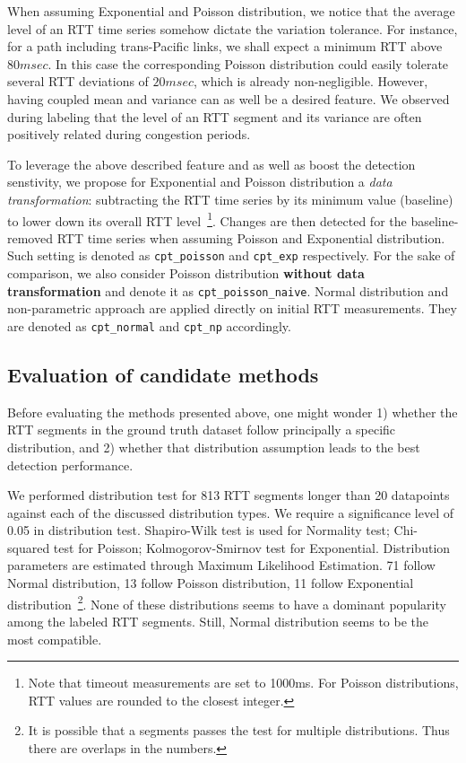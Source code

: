 When assuming Exponential and Poisson distribution, we notice that the average level of an RTT time series somehow dictate the variation tolerance.
For instance, for a path including trans-Pacific links, we shall expect a minimum RTT above $80msec$.
In this case the corresponding Poisson distribution could easily tolerate several RTT deviations of $20msec$, which is already non-negligible.
However, having coupled mean and variance can as well be a desired feature. 
We observed during labeling that the level of an RTT segment and its variance are often positively related during congestion periods. 

To leverage the above described feature and as well as boost the detection senstivity, we propose for Exponential and Poisson distribution a \textit{data transformation}: subtracting the RTT time series by its minimum value (baseline) to lower down its overall RTT level~\footnote{Note that timeout measurements are set to 1000ms. 
For Poisson distributions, RTT values are rounded to the closest integer.}. 
Changes are then detected for the baseline-removed RTT time series when assuming Poisson and Exponential distribution.
Such setting is denoted as \texttt{cpt\_poisson} and \texttt{cpt\_exp} respectively.
For the sake of comparison, we also consider Poisson distribution \textbf{without data transformation} and denote it as \texttt{cpt\_poisson\_naive}.
Normal distribution and non-parametric approach are applied directly on initial RTT measurements.
They are denoted as \texttt{cpt\_normal} and \texttt{cpt\_np} accordingly.

\subsection{Evaluation of candidate methods}
\label{sec:eval}

Before evaluating the methods presented above, one might wonder 1) whether the RTT segments in the ground truth dataset follow principally a specific distribution, and 2) whether that distribution assumption leads to the best detection performance.

We performed distribution test for 813 RTT segments longer than 20 datapoints against each of the discussed distribution types. 
We require a significance level of 0.05 in distribution test. 
Shapiro-Wilk test is used for Normality test;
Chi-squared test for Poisson; 
Kolmogorov-Smirnov test for Exponential. 
Distribution parameters are estimated through Maximum Likelihood Estimation.
71 follow Normal distribution, 13 follow Poisson distribution, 11 follow Exponential distribution~\footnote{It is possible that a segments passes the test for multiple distributions. Thus there are overlaps in the numbers.}. 
None of these distributions seems to have a dominant popularity among the labeled RTT segments.
Still, Normal distribution seems to be the most compatible.

